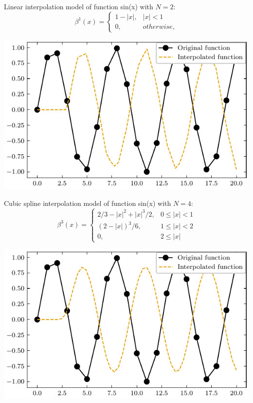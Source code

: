 \documentclass[]{usiinfbachelorproject}
\begin{document}
	Linear interpolation model of function sin(x) with $N = 2$:
	\begin{equation}
		\beta^1(x) = 
		\begin{cases}
			1 - |x|, & |x| < 1    \\
			0,       & otherwise, 
		\end{cases}
	\end{equation}
	\begin{center}
		\includegraphics{"images/linear_interpolation_example.pdf"}
	\end{center}
	
	Cubic spline interpolation model of function sin(x) with $N=4$:
	\begin{equation}
		\beta^3(x) = 
		\begin{cases}
			2/3 - |x|^2 + |x|^3/2, & 0 \leq|x| < 1  \\
			(2-|x|)^3/6,           & 1 \leq |x| < 2 \\
			0,                     & 2 \leq |x|     
		\end{cases}
	\end{equation} \cite{main_article}
	
	\begin{center}
		\includegraphics{"images/cubic_interpolation_example.pdf"}
	\end{center}
	
\end{document}
